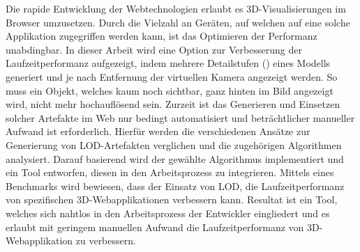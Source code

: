Die rapide Entwicklung der Webtechnologien erlaubt es 3D-Visualisierungen im Browser umzusetzen. Durch die Vielzahl an Geräten, auf welchen auf eine solche Applikation zugegriffen werden kann, ist das Optimieren der Performanz unabdingbar. In dieser Arbeit wird eine Option zur Verbesserung der Laufzeitperformanz aufgezeigt, indem mehrere Detailstufen () eines Modells generiert und je nach Entfernung der virtuellen Kamera angezeigt werden. So muss ein Objekt, welches kaum noch sichtbar, ganz hinten im Bild angezeigt wird, nicht mehr hochauflösend sein.
Zurzeit ist das Generieren und Einsetzen solcher Artefakte im Web nur bedingt automatisiert und beträchtlicher manueller Aufwand ist erforderlich.
\bigbreak
Hierfür werden die verschiedenen Ansätze zur Generierung von LOD-Artefakten verglichen und die zugehörigen Algorithmen analysiert.
Darauf basierend wird der gewählte Algorithmus implementiert und ein Tool entworfen, diesen in den Arbeitsprozess zu integrieren.
Mittels eines Benchmarks wird bewiesen, dass der Einsatz von LOD, die Laufzeitperformanz von spezifischen 3D-Webapplikationen verbessern kann.
\bigbreak
Resultat ist ein Tool, welches sich nahtlos in den Arbeitsprozess der Entwickler eingliedert und es erlaubt mit geringem manuellen Aufwand die Laufzeitperformanz von 3D-Webapplikation zu verbessern.
